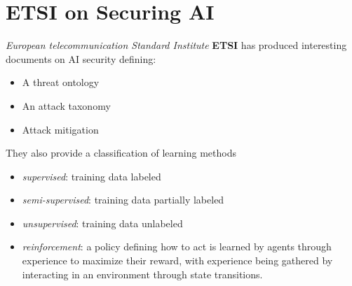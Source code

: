 
\section{ETSI on Securing AI}
\textit{European telecommunication Standard Institute} \textbf{ETSI} has produced
interesting documents on AI security defining:
\begin{itemize}
   \item A threat ontology
   \item An attack taxonomy
   \item Attack mitigation
\end{itemize}

They also provide a classification of learning methods
\begin{itemize}
   \item \textit{supervised}: training data labeled
   \item \textit{semi-supervised}: training data partially labeled
   \item \textit{unsupervised}: training data unlabeled
   \item \textit{reinforcement}: a policy defining how to act is learned by agents through experience to maximize their reward, with experience being gathered by interacting in an environment through state transitions.
\end{itemize} 

